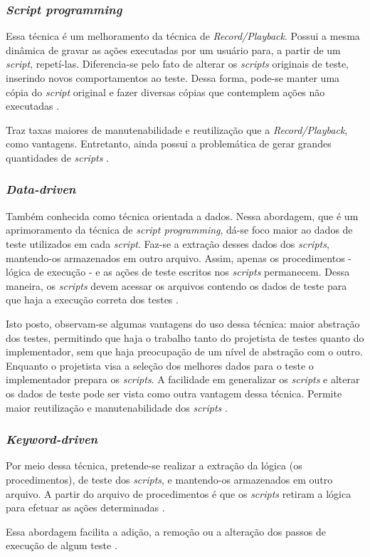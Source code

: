 \subsubsection{\textit{Script programming}}
Essa técnica é um melhoramento da técnica de \textit{Record/Playback}. Possui a
mesma dinâmica de gravar as ações executadas por um usuário para, a partir de
um \textit{script}, repetí-las. Diferencia-se pelo fato de alterar os
\textit{scripts} originais de teste, inserindo novos comportamentos ao teste.
Dessa forma, pode-se manter uma cópia do \textit{script} original e fazer
diversas cópias que contemplem ações não executadas \cite{kent2007}.
\par
\indent Traz taxas maiores de manutenabilidade e reutilização que a
\textit{Record/Playback}, como vantagens. Entretanto, ainda possui a problemática
de gerar grandes quantidades de \textit{scripts} \cite{fantinatoEtAl2004}.
\subsubsection{\textit{Data-driven}}
Também conhecida como técnica orientada a dados. Nessa abordagem, que é um
aprimoramento da técnica de \textit{script programming}, dá-se foco maior ao
dados de teste utilizados em cada \textit{script}. Faz-se a extração desses
dados dos \textit{scripts}, mantendo-os armazenados em outro arquivo. Assim,
apenas os procedimentos - lógica de execução - e as ações de teste escritos nos
\textit{scripts} permanecem. Dessa maneira, os \textit{scripts} devem acessar
os arquivos contendo os dados de teste para que haja a execução correta dos
testes \cite{kent2007}.
\par
\indent Isto posto, observam-se algumas vantagens do uso dessa técnica: maior
abstração dos testes, permitindo que haja o trabalho tanto do projetista de
testes quanto do implementador, sem que haja preocupação de um nível de abstração
com o outro. Enquanto o projetista visa a seleção dos melhores dados para o teste
 o implementador prepara os \textit{scripts}. A facilidade em generalizar os
 \textit{scripts} e alterar os dados de teste pode ser vista como outra vantagem
 dessa técnica. Permite maior reutilização e manutenabilidade dos \textit{scripts}
 \cite{fantinatoEtAl2004}.
\subsubsection{\textit{Keyword-driven}}
Por meio dessa técnica, pretende-se realizar a extração da lógica
(os procedimentos), de teste dos \textit{scripts}, e mantendo-os armazenados em
outro arquivo. A partir do arquivo de procedimentos é que os \textit{scripts}
retiram a lógica para efetuar as ações determinadas \cite{kent2007}.
\par
\indent Essa abordagem facilita a adição, a remoção ou a alteração dos passos de
execução de algum teste \cite{fantinatoEtAl2004}.
